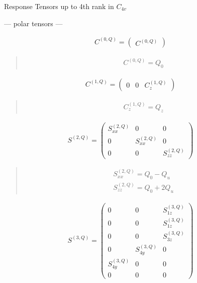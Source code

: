 \documentclass[fleqn,10pt]{jsarticle}
\begin{document}
\setcounter{MaxMatrixCols}{16}

\begin{center}
\LARGE
Response Tensors up to 4th rank in $C_{4v}$
\end{center}
\begin{center}\LARGE --- polar tensors ---\end{center}
\begin{align*}
C^{(0,Q)} = \begin{pmatrix} C^{(0,Q)} \end{pmatrix}
\end{align*}
\begin{quote}
\begin{align*}
& C^{(0,Q)} = Q_{0}
\end{align*}
\end{quote}
\begin{align*}
C^{(1,Q)} = \begin{pmatrix} 0 & 0 & C^{(1,Q)}_{z} \end{pmatrix}
\end{align*}
\begin{quote}
\begin{align*}
& C^{(1,Q)}_{z} = Q_{z}
\end{align*}
\end{quote}
\begin{align*}
S^{(2,Q)} = \begin{pmatrix} S^{(2,Q)}_{xx} & 0 & 0 \\ 0 & S^{(2,Q)}_{xx} & 0 \\ 0 & 0 & S^{(2,Q)}_{zz} \end{pmatrix}
\end{align*}
\begin{quote}
\begin{align*}
& S^{(2,Q)}_{xx} = Q_{0} - Q_{u} \\
& S^{(2,Q)}_{zz} = Q_{0} + 2 Q_{u}
\end{align*}
\end{quote}
\begin{align*}
S^{(3,Q)} = \begin{pmatrix} 0 & 0 & S^{(3,Q)}_{1z} \\ 0 & 0 & S^{(3,Q)}_{1z} \\ 0 & 0 & S^{(3,Q)}_{3z} \\ 0 & S^{(3,Q)}_{4y} & 0 \\ S^{(3,Q)}_{4y} & 0 & 0 \\ 0 & 0 & 0 \end{pmatrix}
\end{align*}
\end{document}
